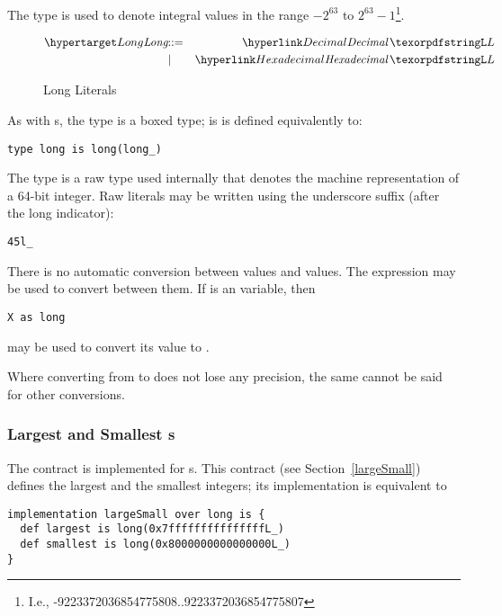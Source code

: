 The  type is used to denote integral values in the range $-2^{63} \mbox{ to } 2^{63}-1$\footnote{I.e., -9223372036854775808..{}9223372036854775807}. 

\begin{figure}[htbp]
\begin{eqnarray*}
\ntDef{Long}&\arrow&\ntRef{Decimal}\,\q{L}\\
&\choice&\ntRef{Hexadecimal}\,\q{L}
\end{eqnarray*}
\caption{Long Literals}
\label{longExpressionFig}
\end{figure}

As with s, the  type is a boxed type; is is defined equivalently to:
\begin{lstlisting}
type long is long(long_)
\end{lstlisting}
The  type is a raw type used internally that denotes the machine representation of a 64-bit integer. Raw  literals may be written using the underscore suffix (after the long indicator):
\begin{lstlisting}
45l_
\end{lstlisting}

\begin{aside}
There is no automatic conversion between  values and  values. The  expression may be used to convert between them. If  is an  variable, then
\begin{lstlisting}
X as long
\end{lstlisting}
may be used to convert its value to .
\begin{aside}
Where converting from  to  does not lose any precision, the same cannot be said for other conversions.
\end{aside}
\end{aside}

\subsubsection{Largest and Smallest s}
The  contract is implemented for s. This contract (see Section~\vref{largeSmall}) defines the largest and the smallest  integers; its implementation is equivalent to
\begin{lstlisting}
implementation largeSmall over long is {
  def largest is long(0x7fffffffffffffffL_)
  def smallest is long(0x8000000000000000L_)
}
\end{lstlisting}



